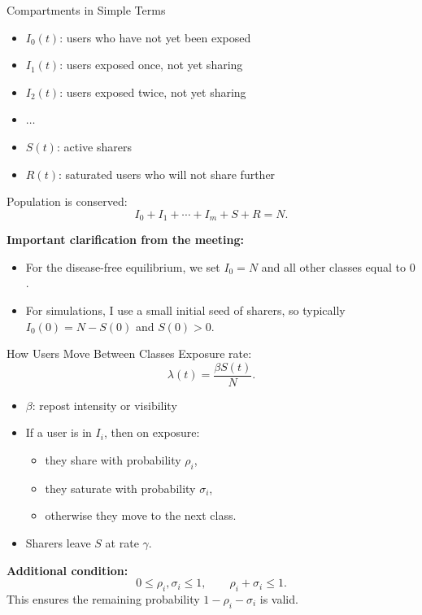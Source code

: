 \documentclass[aspectratio=169]{beamer}
\begin{document}
\begin{frame}{Compartments in Simple Terms}
  \begin{itemize}
    \item $I_0(t)$: users who have not yet been exposed
    \item $I_1(t)$: users exposed once, not yet sharing
    \item $I_2(t)$: users exposed twice, not yet sharing
    \item $\dots$
    \item $S(t)$: active sharers
    \item $R(t)$: saturated users who will not share further
  \end{itemize}

  \vspace{0.4em}
  Population is conserved:
  \[
  I_0 + I_1 + \cdots + I_m + S + R = N.
  \]

  \vspace{0.4em}
  \textbf{Important clarification from the meeting:}
  \begin{itemize}
    \item For the disease-free equilibrium, we set $I_0=N$ and all other classes equal to $0$.
    \item For simulations, I use a small initial seed of sharers, so typically $I_0(0)=N-S(0)$ and $S(0)>0$.
  \end{itemize}
\end{frame}

\begin{frame}{How Users Move Between Classes}
  Exposure rate:
  \[
  \lambda(t)=\frac{\beta S(t)}{N}.
  \]

  \begin{itemize}
    \item $\beta$: repost intensity or visibility
    \item If a user is in $I_i$, then on exposure:
    \begin{itemize}
      \item they share with probability $\rho_i$,
      \item they saturate with probability $\sigma_i$,
      \item otherwise they move to the next class.
    \end{itemize}
    \item Sharers leave $S$ at rate $\gamma$.
  \end{itemize}

  \vspace{0.4em}
  \textbf{Additional condition:}
  \[
  0 \le \rho_i,\sigma_i \le 1,
  \qquad
  \rho_i+\sigma_i \le 1.
  \]
  This ensures the remaining probability $1-\rho_i-\sigma_i$ is valid.
\end{frame}
\end{document}
